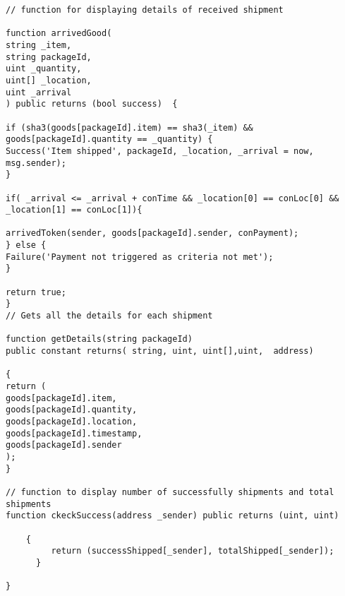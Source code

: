 \begin{lstlisting}
// function for displaying details of received shipment

function arrivedGood(
string _item,
string packageId,
uint _quantity,
uint[] _location,
uint _arrival
) public returns (bool success)  {

if (sha3(goods[packageId].item) == sha3(_item) && goods[packageId].quantity == _quantity) {
Success('Item shipped', packageId, _location, _arrival = now, msg.sender);
} 

if( _arrival <= _arrival + conTime && _location[0] == conLoc[0] &&
_location[1] == conLoc[1]){

arrivedToken(sender, goods[packageId].sender, conPayment);
} else {
Failure('Payment not triggered as criteria not met');
}

return true;
}
// Gets all the details for each shipment

function getDetails(string packageId)
public constant returns( string, uint, uint[],uint,  address)

{
return (
goods[packageId].item,
goods[packageId].quantity,
goods[packageId].location,
goods[packageId].timestamp,
goods[packageId].sender
);
}

// function to display number of successfully shipments and total shipments
function ckeckSuccess(address _sender) public returns (uint, uint)

    {
         return (successShipped[_sender], totalShipped[_sender]);
      }

}

\end{lstlisting}